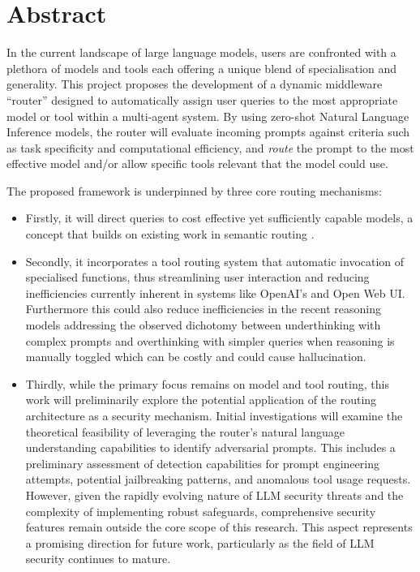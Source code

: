 \chapter*{\center \Large  Abstract}

\noindent In the current landscape of large language models, users are confronted with a plethora of models and tools each offering a unique blend of specialisation and generality. This project proposes the development of a dynamic middleware ``router'' designed to automatically assign user queries to the most appropriate model or tool within a multi-agent system. By using zero-shot Natural Language Inference models, the router will evaluate incoming prompts against criteria such as task specificity and computational efficiency, and \textit{route} the prompt to the most effective model and/or allow specific tools relevant that the model could use.

The proposed framework is underpinned by three core routing mechanisms:

\begin{itemize}
    \item Firstly, it will direct queries to cost effective yet sufficiently capable models, a concept that builds on existing work in semantic routing \cite{semanticrouting2406.18665}.
    
    \item Secondly, it incorporates a tool routing system that automatic invocation of specialised functions, thus streamlining user interaction and reducing inefficiencies currently inherent in systems like OpenAI's and Open Web UI. Furthermore this could also reduce inefficiencies in the recent reasoning models addressing the observed dichotomy between underthinking with complex prompts and overthinking with simpler queries when reasoning is manually toggled which can be costly and could cause hallucination.
    
    \item Thirdly, while the primary focus remains on model and tool routing, this work will preliminarily explore the potential application of the routing architecture as a security mechanism. Initial investigations will examine the theoretical feasibility of leveraging the router's natural language understanding capabilities to identify adversarial prompts. This includes a preliminary assessment of detection capabilities for prompt engineering attempts, potential jailbreaking patterns, and anomalous tool usage requests. However, given the rapidly evolving nature of LLM security threats and the complexity of implementing robust safeguards, comprehensive security features remain outside the core scope of this research. This aspect represents a promising direction for future work, particularly as the field of LLM security continues to mature.
\end{itemize}

